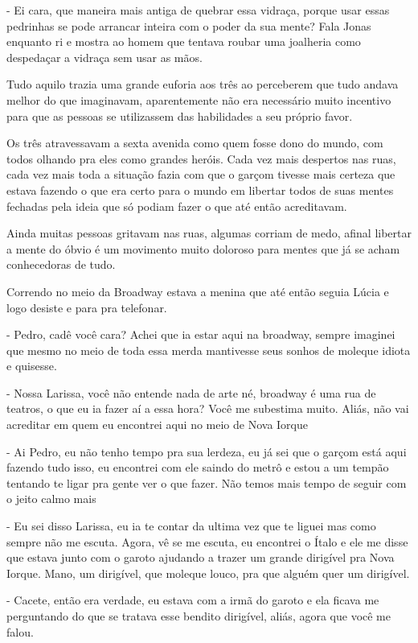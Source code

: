 - Ei cara, que maneira mais antiga de quebrar essa vidraça, porque usar essas pedrinhas se pode arrancar inteira com o poder da sua mente? Fala Jonas enquanto ri e mostra ao homem que tentava roubar uma joalheria como despedaçar a vidraça sem usar as mãos.

Tudo aquilo trazia uma grande euforia aos três ao perceberem que tudo andava melhor do que imaginavam, aparentemente não era necessário muito incentivo para que as pessoas se utilizassem das habilidades a seu próprio favor.

Os três atravessavam a sexta avenida como quem fosse dono do mundo,  com todos olhando pra eles como grandes heróis. Cada vez mais despertos nas ruas, cada vez mais toda a situação fazia com que o garçom tivesse mais certeza que estava fazendo o que era certo para o mundo em libertar todos de suas mentes fechadas pela ideia que só podiam fazer o que até então acreditavam.

Ainda muitas pessoas gritavam nas ruas, algumas corriam de medo, afinal libertar a mente do óbvio é um movimento muito doloroso para mentes que já se acham conhecedoras de tudo.

Correndo no meio da Broadway estava a menina que até então seguia Lúcia e logo desiste e para pra telefonar.

- Pedro, cadê você cara? Achei que ia estar aqui na broadway, sempre imaginei que mesmo no meio de toda essa merda mantivesse seus sonhos de moleque idiota e quisesse.

- Nossa Larissa, você não entende nada de arte né, broadway é uma rua de teatros, o que eu ia fazer aí a essa hora? Você me subestima muito. Aliás, não vai acreditar em quem eu encontrei aqui no meio de Nova Iorque

- Ai Pedro, eu não tenho tempo pra sua lerdeza, eu já sei que o garçom está aqui fazendo tudo isso, eu encontrei com ele saindo do metrô e estou a um tempão tentando te ligar pra gente ver o que fazer.  Não temos mais tempo de seguir com o jeito calmo mais

- Eu sei disso Larissa, eu ia te contar da ultima vez que te liguei mas como sempre não me escuta. Agora, vê se me escuta, eu encontrei o Ítalo e ele me disse que estava junto com o garoto ajudando a trazer um grande dirigível pra Nova Iorque. Mano, um dirigível, que moleque louco, pra que alguém quer um dirigível.

- Cacete, então era verdade, eu estava com a irmã do garoto e ela ficava me perguntando do que se tratava esse bendito dirigível, aliás, agora que você me falou.

